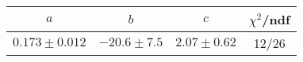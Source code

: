 \begin{tabular}{c|c|c|c}
$a$ & $b$ & $c$ & $\chi^2$/ndf \\
\hline
$0.173\pm0.012$ & $-20.6\pm7.5$ & $2.07\pm0.62$ & 12/26
\end{tabular}
